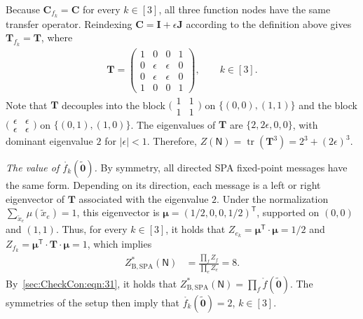 \documentclass[journal]{IEEEtran}
\newcommand{\vect}[1]{ \bm{#1} }
\newcommand{\tran}{\mathsf{T}}
\newcommand{\vmu}{ \vect{ \mu } }
\newcommand{\graphN}{ \mathsf{N} }
\newcommand{\ZBSPA}{ Z_{\mathrm{B,SPA}} }
\newcommand{\matr}[1]{\vect{#1}}
\newcommand{\LCT}[1]{ \mathring{#1} }
\newcommand{\txe}{ \tilde{x}_{e} }
\newcommand{\tv}[1]{ \tilde{\vect{#1}} }
\begin{document}
\begin{appendices}
{    Because $\matr{C}_{f_k}=\matr{C}$ for every $k\in[3]$, all three
    function nodes have the same transfer operator. Reindexing
    $\matr{C}=\matr{I}+\epsilon\matr{J}$ according to the definition above
    gives $\matr{T}_{f_k}=\matr{T}$, where
    \begin{align*}
      \matr{T}
      =
      \begin{pmatrix}
        1 & 0        & 0        & 1 \\
        0 & \epsilon & \epsilon & 0 \\
        0 & \epsilon & \epsilon & 0 \\
        1 & 0        & 0        & 1
      \end{pmatrix},
      \qquad k\in[3].
    \end{align*}
    Note that $\matr{T}$ decouples into the block
    $\bigl( \begin{smallmatrix} 1 & 1 \\ 1 & 1 \end{smallmatrix} \bigr)$ on
    $\{ (0,0), (1,1) \}$ and the block
    $\bigl( \begin{smallmatrix} \epsilon & \epsilon \\ \epsilon &
        \epsilon \end{smallmatrix} \bigr)$ on $\{ (0,1), (1,0) \}$. The
    eigenvalues of $\matr{T}$ are $\{ 2, 2\epsilon, 0, 0 \}$, with dominant
    eigenvalue $2$ for $ |\epsilon| < 1$. Therefore,
    $Z(\graphN) = \operatorname{tr}(\matr{T}^3) = 2^{3} + (2\epsilon)^{3}$.

    \emph{The value of $\LCT{f_k}(\tv{0})$.} By symmetry, all directed SPA
    fixed-point messages have the same form. Depending on its direction, each
    message is a left or right eigenvector of $\matr{T}$ associated
    with the eigenvalue $2$. Under the normalization
    $\sum_{\txe}\mu(\txe)=1$, this eigenvector is
    $\vmu=(1/2,0,0,1/2)^{\tran}$, supported on $(0,0)$ and $(1,1)$. Thus, for every $k\in[3]$, it holds that
    $Z_{e_k} = \vmu^{\tran} \cdot \vmu = 1/2$ and
    $Z_{f_k}= \vmu^{\tran}\cdot\matr{T}\cdot\vmu = 1$, which implies
    \begin{align*}
      \ZBSPA^{*}(\graphN)
       & = \frac{ \prod_f Z_f }{ \prod_e Z_e }
      = 8.
    \end{align*}
    By~\eqref{sec:CheckCon:eqn:31}, it holds that
    $\ZBSPA^{*}(\graphN) = \prod_f\LCT{f}(\tv{0})$. The symmetries of the
    setup then imply that $\LCT{f_k}(\tv{0}) = 2$, $k\in[3]$.

}
\end{appendices}
\end{document}

